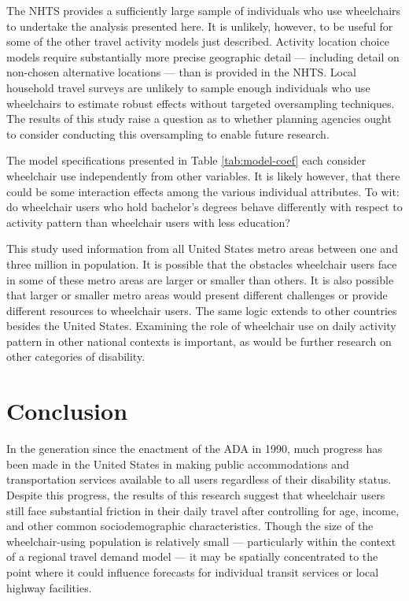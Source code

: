 \documentclass[3p, authoryear, review]{elsarticle} %
\begin{document}
The NHTS provides a sufficiently large sample of individuals who use wheelchairs
to undertake the analysis presented here. It is unlikely, however, to be useful
for some of the other travel activity models just described. Activity location
choice models require substantially more precise geographic detail --- including
detail on non-chosen alternative locations --- than is provided in the NHTS.
Local household travel surveys are unlikely to sample enough individuals who use
wheelchairs to estimate robust effects without targeted oversampling techniques.
The results of this study raise a question as to whether planning agencies
ought to consider conducting this oversampling to enable future research.

The model specifications presented in Table \ref{tab:model-coef} each consider
wheelchair use independently from other variables. It is likely however, that there
could be some interaction effects among the various individual attributes.
To wit: do wheelchair users who hold bachelor's degrees behave differently
with respect to activity pattern than wheelchair users with less education?

This study used information from all United States metro areas between one and
three million in population. It is possible that the obstacles wheelchair users
face in some of these metro areas are larger or smaller than others. It is also
possible that larger or smaller metro areas would present different challenges
or provide different resources to wheelchair users. The same logic extends to other
countries besides the United States. Examining the role of wheelchair use on daily
activity pattern in other national contexts is important, as would be further
research on other categories of disability.

\hypertarget{conclusion}{%
\section{Conclusion}\label{conclusion}}

In the generation since the enactment of the ADA in 1990, much progress has
been made in the United States in making public accommodations and transportation
services available to all users regardless of their disability status.
Despite this progress, the results of this research suggest that wheelchair
users still face substantial friction in their daily travel after controlling
for age, income, and other common sociodemographic characteristics. Though
the size of the wheelchair-using population is relatively small --- particularly
within the context of a regional travel demand model --- it may be spatially
concentrated to the point where it could influence forecasts for individual transit
services or local highway facilities.
\end{document}
